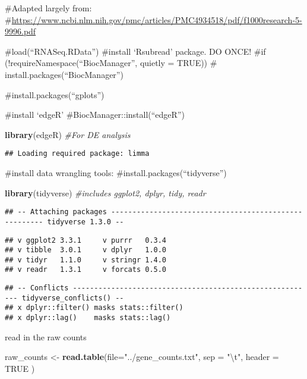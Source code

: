 \documentclass[
]{article}
\newenvironment{Shaded}{\begin{snugshade}}{\end{snugshade}}
\newcommand{\CharTok}[1]{\textcolor[rgb]{0.31,0.60,0.02}{#1}}
\newcommand{\CommentTok}[1]{\textcolor[rgb]{0.56,0.35,0.01}{\textit{#1}}}
\newcommand{\DataTypeTok}[1]{\textcolor[rgb]{0.13,0.29,0.53}{#1}}
\newcommand{\KeywordTok}[1]{\textcolor[rgb]{0.13,0.29,0.53}{\textbf{#1}}}
\newcommand{\NormalTok}[1]{#1}
\newcommand{\OtherTok}[1]{\textcolor[rgb]{0.56,0.35,0.01}{#1}}
\newcommand{\StringTok}[1]{\textcolor[rgb]{0.31,0.60,0.02}{#1}}
\begin{document}
\#Adapted largely from:
\#\url{https://www.ncbi.nlm.nih.gov/pmc/articles/PMC4934518/pdf/f1000research-5-9996.pdf}

\#load(``RNASeq.RData'') \#install `Rsubread' package. DO ONCE! \#if
(!requireNamespace(``BiocManager'', quietly = TRUE)) \#
install.packages(``BiocManager'')

\#install.packages(``gplots'')

\#install `edgeR' \#BiocManager::install(``edgeR'')

\begin{Shaded}
\begin{Highlighting}[]
\KeywordTok{library}\NormalTok{(edgeR) }\CommentTok{#For DE analysis}
\end{Highlighting}
\end{Shaded}

\begin{verbatim}
## Loading required package: limma
\end{verbatim}

\#install data wrangling tools: \#install.packages(``tidyverse'')

\begin{Shaded}
\begin{Highlighting}[]
\KeywordTok{library}\NormalTok{(tidyverse) }\CommentTok{#includes ggplot2, dplyr, tidy, readr}
\end{Highlighting}
\end{Shaded}

\begin{verbatim}
## -- Attaching packages ------------------------------------------------------ tidyverse 1.3.0 --
\end{verbatim}

\begin{verbatim}
## v ggplot2 3.3.1     v purrr   0.3.4
## v tibble  3.0.1     v dplyr   1.0.0
## v tidyr   1.1.0     v stringr 1.4.0
## v readr   1.3.1     v forcats 0.5.0
\end{verbatim}

\begin{verbatim}
## -- Conflicts --------------------------------------------------------- tidyverse_conflicts() --
## x dplyr::filter() masks stats::filter()
## x dplyr::lag()    masks stats::lag()
\end{verbatim}

read in the raw counts

\begin{Shaded}
\begin{Highlighting}[]
\NormalTok{raw_counts <-}\StringTok{ }\KeywordTok{read.table}\NormalTok{(}\DataTypeTok{file=}\StringTok{"../gene_counts.txt"}\NormalTok{, }
                         \DataTypeTok{sep =} \StringTok{"}\CharTok{\textbackslash{}t}\StringTok{"}\NormalTok{, }
                         \DataTypeTok{header =} \OtherTok{TRUE}
\NormalTok{)}
\end{Highlighting}
\end{Shaded}
\end{document}
